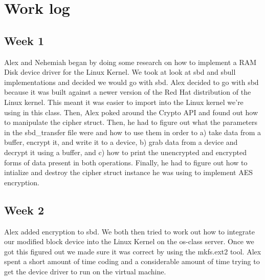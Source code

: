 \documentclass[letterpaper,10pt,titlepage]{article}
\begin{document}
\section{Work log}
\subsection{Week 1}
Alex and Nehemiah began by doing some research on how to implement a RAM Disk device driver for the Linux Kernel. We took at look at sbd and sbull implementations and decided we would go with sbd. Alex decided to go with sbd because it was built against a newer version of the Red Hat distribution of the Linux kernel. This meant it was easier to import into the Linux kernel we're using in this class. Then, Alex poked around the Crypto API and found out how to manipulate the cipher struct. Then, he had to figure out what the parameters in the sbd\_transfer file were and how to use them in order to a) take data from a buffer, encrypt it, and write it to a device, b) grab data from a device and decrypt it using a buffer, and c) how to print the unencrypted and encrypted forms of data present in both operations. Finally, he had to figure out how to intialize and destroy the cipher struct instance he was using to implement AES encryption.
\subsection{Week 2}
Alex added encryption to sbd. We both then tried to work out how to integrate our modified block device into the Linux Kernel on the os-class server. Once we got this figured out we made sure it was correct by using the mkfs.ext2 tool. Alex spent a short amount of time coding and a considerable amount of time trying to get the device driver to run on the virtual machine.

%
%
\end{document}
